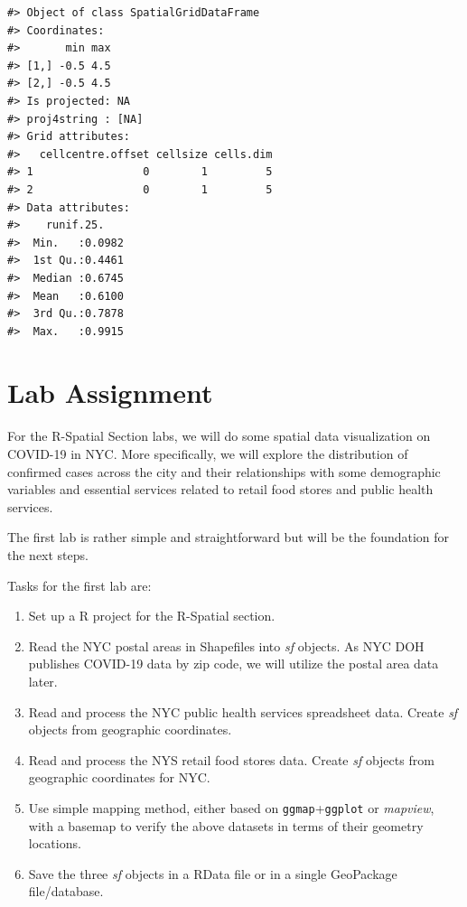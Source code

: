 \documentclass[
  11pt,
]{book}
\providecommand{\tightlist}{%
  \setlength{\itemsep}{0pt}\setlength{\parskip}{0pt}}
\begin{document}
\begin{verbatim}
#> Object of class SpatialGridDataFrame
#> Coordinates:
#>       min max
#> [1,] -0.5 4.5
#> [2,] -0.5 4.5
#> Is projected: NA 
#> proj4string : [NA]
#> Grid attributes:
#>   cellcentre.offset cellsize cells.dim
#> 1                 0        1         5
#> 2                 0        1         5
#> Data attributes:
#>    runif.25.     
#>  Min.   :0.0982  
#>  1st Qu.:0.4461  
#>  Median :0.6745  
#>  Mean   :0.6100  
#>  3rd Qu.:0.7878  
#>  Max.   :0.9915
\end{verbatim}

\hypertarget{lab-assignment}{%
\section{Lab Assignment}\label{lab-assignment}}

For the R-Spatial Section labs, we will do some spatial data visualization on COVID-19 in NYC. More specifically, we will explore the distribution of confirmed cases across the city and their relationships with some demographic variables and essential services related to retail food stores and public health services.

The first lab is rather simple and straightforward but will be the foundation for the next steps.

Tasks for the first lab are:

\begin{enumerate}
\def\labelenumi{\arabic{enumi}.}
\tightlist
\item
  Set up a R project for the R-Spatial section.
\item
  Read the NYC postal areas in Shapefiles into \emph{sf} objects. As NYC DOH publishes COVID-19 data by zip code, we will utilize the postal area data later.
\item
  Read and process the NYC public health services spreadsheet data. Create \emph{sf} objects from geographic coordinates.
\item
  Read and process the NYS retail food stores data. Create \emph{sf} objects from geographic coordinates for NYC.
\item
  Use simple mapping method, either based on \texttt{ggmap}+\texttt{ggplot} or \emph{mapview}, with a basemap to verify the above datasets in terms of their geometry locations.
\item
  Save the three \emph{sf} objects in a RData file or in a single GeoPackage file/database.
\end{enumerate}
\end{document}
